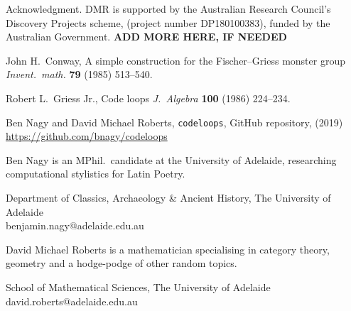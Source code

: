 \documentclass{article}
\theoremstyle{plain}
\theoremstyle{definition}
\newtheorem*{definition}{Definition}
\newtheorem*{remark}{Remark}
\begin{document}



\begin{acknowledgment}{Acknowledgment.}
DMR is supported by the Australian Research Council's Discovery Projects scheme, (project number DP180100383), funded by the Australian Government. \textbf{ADD MORE HERE, IF NEEDED}
\end{acknowledgment}

\begin{thebibliography}{1}

 John H.\ Conway, A simple construction for the Fischer--Griess monster group \emph{Invent.\ math.} \textbf{79} (1985) 513--540.

 Robert L.\ Griess Jr., Code loops \emph{J.\ Algebra} \textbf{100} (1986) 224--234.

 Ben Nagy and David Michael Roberts, \texttt{codeloops}, GitHub repository, (2019) \url{https://github.com/bnagy/codeloops}
\end{thebibliography}

\begin{biog}
\item[Ben Nagy] is an MPhil.\ candidate at the University of Adelaide, researching computational stylistics for Latin Poetry.
\begin{affil}
Department of Classics, Archaeology \& Ancient History, The University of Adelaide\\
benjamin.nagy@adelaide.edu.au
\end{affil}

\item[David Michael Roberts] is a mathematician specialising in category theory, geometry and a hodge-podge of other random topics.
\begin{affil}
School of Mathematical Sciences, The University of Adelaide\\
david.roberts@adelaide.edu.au
\end{affil}
\end{biog}
\vfill\eject
\end{document}
